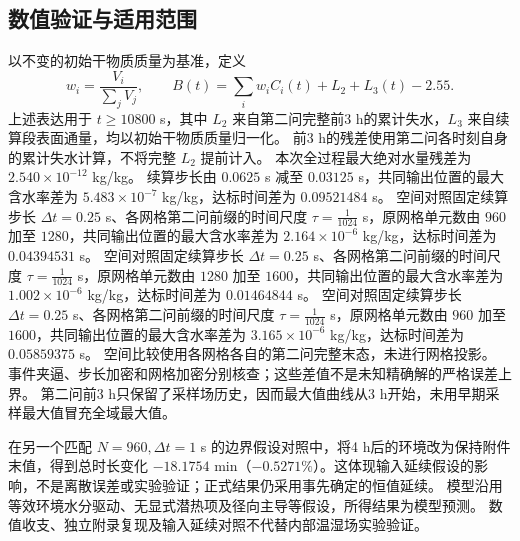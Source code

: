 \subsection{数值验证与适用范围}
以不变的初始干物质质量为基准，定义
\begin{equation}
w_i=\frac{V_i}{\sum_jV_j},\qquad
B(t)=\sum_iw_iC_i(t)+L_2+L_3(t)-2.55.
\end{equation}
上述表达用于 $t\ge10800$ s，其中 $L_2$ 来自第二问完整前3 h的累计失水，$L_3$ 来自续算段表面通量，均以初始干物质质量归一化。
前3 h的残差使用第二问各时刻自身的累计失水计算，不将完整 $L_2$ 提前计入。
本次全过程最大绝对水量残差为 $2.540\times10^{-12}$ kg/kg。
续算步长由 $0.0625$ s 减至 $0.03125$ s，共同输出位置的最大含水率差为 $5.483\times10^{-7}$ kg/kg，达标时间差为 $0.09521484$ s。
空间对照固定续算步长 $\Delta t=0.25$ s、各网格第二问前缀的时间尺度 $\tau=\frac{1}{1024}$ s，原网格单元数由 $960$ 加至 $1280$，共同输出位置的最大含水率差为 $2.164\times10^{-6}$ kg/kg，达标时间差为 $0.04394531$ s。
空间对照固定续算步长 $\Delta t=0.25$ s、各网格第二问前缀的时间尺度 $\tau=\frac{1}{1024}$ s，原网格单元数由 $1280$ 加至 $1600$，共同输出位置的最大含水率差为 $1.002\times10^{-6}$ kg/kg，达标时间差为 $0.01464844$ s。
空间对照固定续算步长 $\Delta t=0.25$ s、各网格第二问前缀的时间尺度 $\tau=\frac{1}{1024}$ s，原网格单元数由 $960$ 加至 $1600$，共同输出位置的最大含水率差为 $3.165\times10^{-6}$ kg/kg，达标时间差为 $0.05859375$ s。
空间比较使用各网格各自的第二问完整末态，未进行网格投影。
事件夹逼、步长加密和网格加密分别核查；这些差值不是未知精确解的严格误差上界。
第二问前3 h只保留了采样场历史，因而最大值曲线从3 h开始，未用早期采样最大值冒充全域最大值。

在另一个匹配 $N=960,\Delta t=1$ s 的边界假设对照中，将4 h后的环境改为保持附件末值，得到总时长变化 $-18.1754$ min（$-0.5271\%$）。这体现输入延续假设的影响，不是离散误差或实验验证；正式结果仍采用事先确定的恒值延续。
模型沿用等效环境水分驱动、无显式潜热项及径向主导等假设，所得结果为模型预测。
数值收支、独立附录复现及输入延续对照不代替内部温湿场实验验证。
